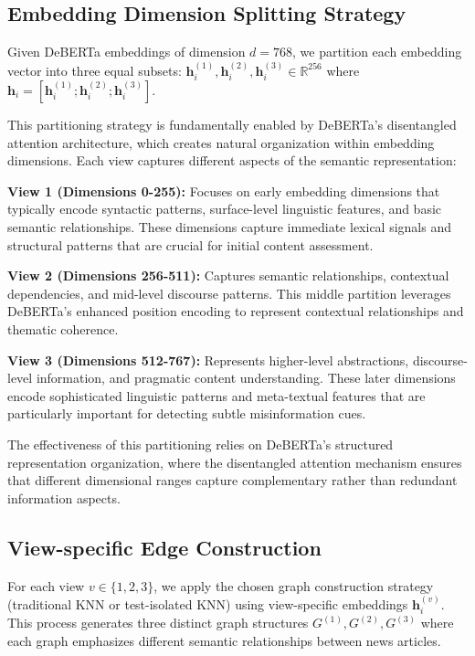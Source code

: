 \subsection{Embedding Dimension Splitting Strategy}

Given DeBERTa embeddings of dimension $d = 768$, we partition each embedding vector into three equal subsets: $\mathbf{h}_i^{(1)}, \mathbf{h}_i^{(2)}, \mathbf{h}_i^{(3)} \in \mathbb{R}^{256}$ where $\mathbf{h}_i = [\mathbf{h}_i^{(1)}; \mathbf{h}_i^{(2)}; \mathbf{h}_i^{(3)}]$.

This partitioning strategy is fundamentally enabled by DeBERTa's disentangled attention architecture, which creates natural organization within embedding dimensions. Each view captures different aspects of the semantic representation:

\textbf{View 1 (Dimensions 0-255):} Focuses on early embedding dimensions that typically encode syntactic patterns, surface-level linguistic features, and basic semantic relationships. These dimensions capture immediate lexical signals and structural patterns that are crucial for initial content assessment.

\textbf{View 2 (Dimensions 256-511):} Captures semantic relationships, contextual dependencies, and mid-level discourse patterns. This middle partition leverages DeBERTa's enhanced position encoding to represent contextual relationships and thematic coherence.

\textbf{View 3 (Dimensions 512-767):} Represents higher-level abstractions, discourse-level information, and pragmatic content understanding. These later dimensions encode sophisticated linguistic patterns and meta-textual features that are particularly important for detecting subtle misinformation cues.

The effectiveness of this partitioning relies on DeBERTa's structured representation organization, where the disentangled attention mechanism ensures that different dimensional ranges capture complementary rather than redundant information aspects.

\subsection{View-specific Edge Construction}

For each view $v \in \{1, 2, 3\}$, we apply the chosen graph construction strategy (traditional KNN or test-isolated KNN) using view-specific embeddings $\mathbf{h}_i^{(v)}$. This process generates three distinct graph structures $G^{(1)}, G^{(2)}, G^{(3)}$ where each graph emphasizes different semantic relationships between news articles.

